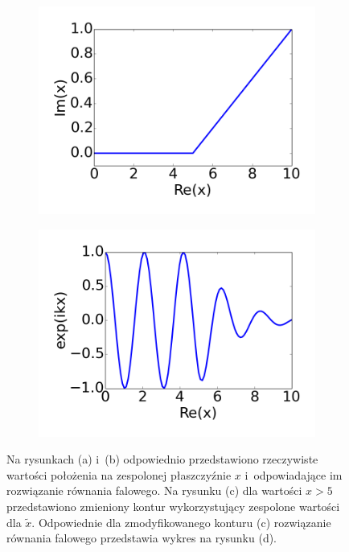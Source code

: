 \begin{figure}[tb]
	\begin{subfigure}{0.45\textwidth}
		\includegraphics[width=\textwidth]{images/pml/complex-x.png}
		\caption{}
		\label{fig:complex-contour}
	\end{subfigure}
	\begin{subfigure}{0.45\textwidth}
		\includegraphics[width=\textwidth]{images/pml/complex-x-wave.png}
		\caption{}
		\label{fig:absorbing-region}
	\end{subfigure}

	\caption{Na rysunkach (a) i~(b) odpowiednio przedstawiono rzeczywiste wartości położenia na zespolonej płaszczyźnie $x$ i~odpowiadające im rozwiązanie równania falowego. Na rysunku (c) dla wartości $x>5$ przedstawiono zmieniony kontur wykorzystujący zespolone wartości dla $\tilde{x}$. Odpowiednie dla zmodyfikowanego konturu (c)  rozwiązanie równania falowego przedstawia wykres na rysunku (d).}
	\label{fig:var-transform}
\end{figure}


